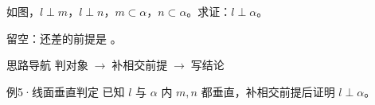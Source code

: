 \documentclass{exam-zh}
\begin{document}
\begin{eduProblemBlock}[例5·线面垂直判定]
\noindent
\begin{minipage}[t]{\dimexpr\linewidth-70mm-6mm\relax}
\vspace{0pt}
如图，$l\perp m$，$l\perp n$，$m\subset\alpha$，$n\subset\alpha$。求证：$l\perp\alpha$。
\par\noindent 留空：还差的前提是 \underline{\hspace{20mm}}。

\end{minipage}\hfill
\begin{diagramcoltikz}{70mm}{直线 l 与平面 α 内的直线 m、n 都垂直。}
}
\end{diagramcoltikz}
\end{eduProblemBlock}





\begin{eduAuxItem}{思路导航}
判对象$\;\to\;$补相交前提$\;\to\;$写结论\end{eduAuxItem}




\begin{eduSubQuestionItem}{例5·线面垂直判定}
已知 $l$ 与 $\alpha$ 内 $m,n$ 都垂直，补相交前提后证明 $l\perp\alpha$。\end{eduSubQuestionItem}

\begin{eduDualExplain}
  \begin{eduExplainLeft}
  \end{eduExplainLeft}

  \begin{eduExplainRight}
  \end{eduExplainRight}
\end{eduDualExplain}
\end{document}
